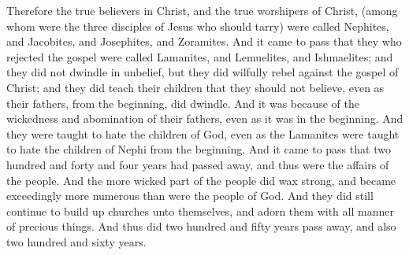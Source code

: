 \bverse \iffalse Therefore the true believers in Christ, and the true worshipers of Christ, (among whom were the three disciples of Jesus who should tarry) were called Nephites, and Jacobites, and Josephites, and Zoramites. \fi
Therefore the true believers in Christ, and the true worshipers of Christ, (among whom were the three disciples of Jesus who should tarry) were called Nephites, and Jacobites, and Josephites, and Zoramites.
\bverse \iffalse And it came to pass that they who rejected the gospel were called Lamanites, and Lemuelites, and Ishmaelites; and they did not dwindle in unbelief, but they did wilfully rebel against the gospel of Christ; and they did teach their children that they should not believe, even as their fathers, from the beginning, did dwindle. \fi
And it came to pass that they who rejected the gospel were called Lamanites, and Lemuelites, and Ishmaelites; and they did not dwindle in unbelief, but they did wilfully rebel against the gospel of Christ; and they did teach their children that they should not believe, even as their fathers, from the beginning, did dwindle.
\bverse \iffalse And it was because of the wickedness and abomination of their fathers, even as it was in the beginning. And they were taught to hate the children of God, even as the Lamanites were taught to hate the children of Nephi from the beginning. \fi
And it was because of the wickedness and abomination of their fathers, even as it was in the beginning. And they were taught to hate the children of God, even as the Lamanites were taught to hate the children of Nephi from the beginning.
\bverse \iffalse And it came to pass that two hundred and forty and four years had passed away, and thus were the affairs of the people. And the more wicked part of the people did wax strong, and became exceedingly more numerous than were the people of God. \fi
And it came to pass that two hundred and forty and four years had passed away, and thus were the affairs of the people. And the more wicked part of the people did wax strong, and became exceedingly more numerous than were the people of God.
\bverse \iffalse And they did still continue to build up churches unto themselves, and adorn them with all manner of precious things.  And thus did two hundred and fifty years pass away, and also two hundred and sixty years. \fi
And they did still continue to build up churches unto themselves, and adorn them with all manner of precious things.  And thus did two hundred and fifty years pass away, and also two hundred and sixty years.
